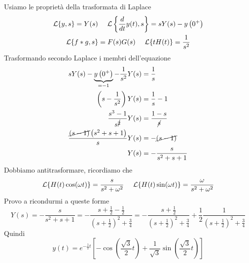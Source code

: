 Usiamo le proprietà della trasformata di Laplace
\begin{gather*}
\mathcal{L}\{y,s\} = Y(s) \ \ \ \ \mathcal{L}\left\{\frac{d}{dt} y(t) ,s\right\} = sY(s) - y\left(0^{ + }\right)\\
\mathcal{L}\{f*g,s\} = F(s) G(s) \ \ \ \ \mathcal{L}\{tH(t)\} = \frac{1}{s^{2}}
\end{gather*}
Trasformando secondo Laplace i membri dell'equazione
\begin{align*}
sY(s) - \underbrace{y\left(0^{ + }\right)}_{ = -1} - \frac{1}{s^{2}} Y(s) & = \frac{1}{s}\\
\left(s - \frac{1}{s^{2}}\right) Y(s) & = \frac{1}{s} - 1\\
\frac{s^{3} - 1}{s^{\cancel{2}}} Y(s) & = \frac{1 - s}{\cancel{s}}\\
\frac{\cancel{(s - 1)}\left(s^{2} + s + 1\right)}{s} Y(s) & = - \cancel{(s - 1)}\\
Y(s) & = - \frac{s}{s^{2} + s + 1}
\end{align*}
Dobbiamo antitrasformare, ricordiamo che
\begin{equation*}
\mathcal{L}\{H(t)\cos(\omega t)\} = \frac{s}{s^{2} + \omega ^{2}} \ \ \ \ \mathcal{L}\{H(t)\sin(\omega t)\} = \frac{\omega }{s^{2} + \omega ^{2}}
\end{equation*}
Provo a ricondurmi a queste forme
\begin{equation*}
Y(s) = - \frac{s}{s^{2} + s + 1} = - \frac{s + \frac{1}{2} - \frac{1}{2}}{\left(s + \frac{1}{2}\right)^{2} + \frac{3}{4}} = - \frac{s + \frac{1}{2}}{\left(s + \frac{1}{2}\right)^{2} + \frac{3}{4}} + \frac{1}{2}\frac{1}{\left(s + \frac{1}{2}\right)^{2} + \frac{3}{4}}
\end{equation*}
Quindi
\begin{equation*}
y(t) = e^{ - \frac{1}{2} t}\left[ - \cos\left(\frac{\sqrt{3}}{2} t\right) + \frac{1}{\sqrt{3}}\sin\left(\frac{\sqrt{3}}{2} t\right)\right]
\end{equation*}
\Soluzione

